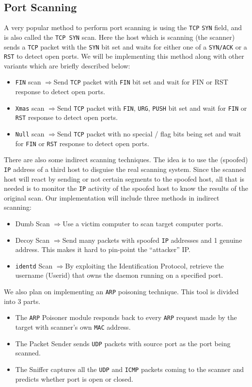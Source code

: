 \documentclass{article}
\newcommand{\ar}{\(\Rightarrow\)}
\begin{document}
\subsection{Port Scanning}
\begin{flushleft}
A very popular method to perform port scanning is using the \texttt{TCP} \texttt{SYN} field, and is also called the \texttt{TCP SYN} scan. Here the host which is scanning (the scanner) sends a \texttt{TCP} packet with the \texttt{SYN} bit set and waits for either one of a \texttt{SYN/ACK} or a \texttt{RST} to detect open ports. We will be implementing this method along with other variants which are briefly described below:
\begin{itemize}
\item \texttt{FIN} scan \ar Send \texttt{TCP} packet with \texttt{FIN} bit set and wait for FIN or RST response to detect open ports.
\item \texttt{Xmas} scan \ar Send \texttt{TCP} packet with \texttt{FIN}, \texttt{URG}, \texttt{PUSH} bit set and wait for \texttt{FIN} or \texttt{RST} response to detect open ports.
\item \texttt{Null} scan \ar Send \texttt{TCP} packet with no special / flag bits being set and wait for \texttt{FIN} or \texttt{RST} response to detect open ports.
\end{itemize}

There are also some indirect scanning techniques. The idea is to use the (spoofed) \texttt{IP} address of a third host to disguise the real  scanning system. Since the scanned host will react by sending or not certain segments to the spoofed host, all that is needed is to monitor the \texttt{IP} activity of the spoofed host to know the results of the original scan. Our implementation will include three methods in indirect scanning:
\begin{itemize}
\item Dumb Scan \ar Use a victim computer to scan target computer ports.
\item Decoy Scan \ar Send many packets with spoofed \texttt{IP} addresses and 1 genuine address. This makes it hard to pin-point the ``attacker'' IP.
\item \texttt{identd} Scan \ar By exploiting the Identification Protocol, retrieve the username (Userid) that owns the daemon running on a specified port.
\end{itemize}

We also plan on implementing an \texttt{ARP} poisoning technique. This tool is divided into 3 parts.
\begin{itemize}
\item The \texttt{ARP} Poisoner module responds back to every \texttt{ARP} request made by the target with scanner's own \texttt{MAC} address.
\item The Packet Sender sends \texttt{UDP} packets with source port as the port being scanned.
\item The Sniffer captures all the \texttt{UDP} and \texttt{ICMP} packets coming to the scanner and predicts whether port is open or closed.
\end{itemize}
\end{flushleft}
\end{document}
